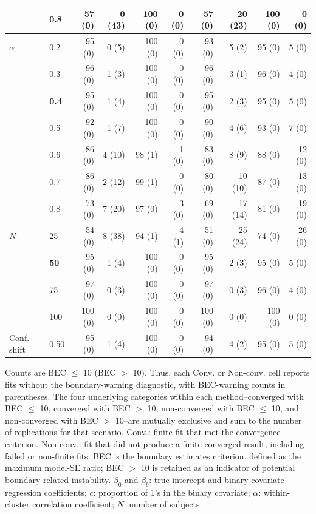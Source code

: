 \begin{table}[htbp]
\begin{tabular}{ll|rr|rr|rr|rr}
 & 0.8 & 57 (0) & 0 (43) & 100 (0) & 0 (0) & 57 (0) & 20 (23) & 100 (0) & 0 (0) \\
\hline
$\alpha$ & 0.2 & 95 (0) & 0 (5) & 100 (0) & 0 (0) & 93 (0) & 5 (2) & 95 (0) & 5 (0) \\
 & 0.3 & 96 (0) & 1 (3) & 100 (0) & 0 (0) & 96 (0) & 3 (1) & 96 (0) & 4 (0) \\
 & \textbf{0.4} & 95 (0) & 1 (4) & 100 (0) & 0 (0) & 95 (0) & 2 (3) & 95 (0) & 5 (0) \\
 & 0.5 & 92 (0) & 1 (7) & 100 (0) & 0 (0) & 90 (0) & 4 (6) & 93 (0) & 7 (0) \\
 & 0.6 & 86 (0) & 4 (10) & 98 (1) & 1 (0) & 83 (0) & 8 (9) & 88 (0) & 12 (0) \\
 & 0.7 & 86 (0) & 2 (12) & 99 (1) & 0 (0) & 80 (0) & 10 (10) & 87 (0) & 13 (0) \\
 & 0.8 & 73 (0) & 7 (20) & 97 (0) & 3 (0) & 69 (0) & 17 (14) & 81 (0) & 19 (0) \\
\hline
$N$ & 25 & 54 (0) & 8 (38) & 94 (1) & 4 (1) & 51 (0) & 25 (24) & 74 (0) & 26 (0) \\
 & \textbf{50} & 95 (0) & 1 (4) & 100 (0) & 0 (0) & 95 (0) & 2 (3) & 95 (0) & 5 (0) \\
 & 75 & 97 (0) & 0 (3) & 100 (0) & 0 (0) & 97 (0) & 0 (3) & 96 (0) & 4 (0) \\
 & 100 & 100 (0) & 0 (0) & 100 (0) & 0 (0) & 100 (0) & 0 (0) & 100 (0) & 0 (0) \\
\hline
Conf. shift & 0.50 & 95 (0) & 1 (4) & 100 (0) & 0 (0) & 94 (0) & 4 (2) & 95 (0) & 5 (0) \\
\hline
\end{tabular}
\begin{flushleft}
\footnotesize Counts are BEC $\leq$ 10 (BEC $>$ 10). Thus, each Conv. or Non-conv. cell reports fits without the boundary-warning diagnostic, with BEC-warning counts in parentheses. The four underlying categories within each method--converged with BEC $\leq$ 10, converged with BEC $>$ 10, non-converged with BEC $\leq$ 10, and non-converged with BEC $>$ 10--are mutually exclusive and sum to the number of replications for that scenario. Conv.: finite fit that met the convergence criterion. Non-conv.: fit that did not produce a finite converged result, including failed or non-finite fits. BEC is the boundary estimates criterion, defined as the maximum model-SE ratio; BEC $>$ 10 is retained as an indicator of potential boundary-related instability. $\beta_0$ and $\beta_b$: true intercept and binary covariate regression coefficients; $c$: proportion of 1's in the binary covariate; $\alpha$: within-cluster correlation coefficient; $N$: number of subjects.
\end{flushleft}
\end{table}
